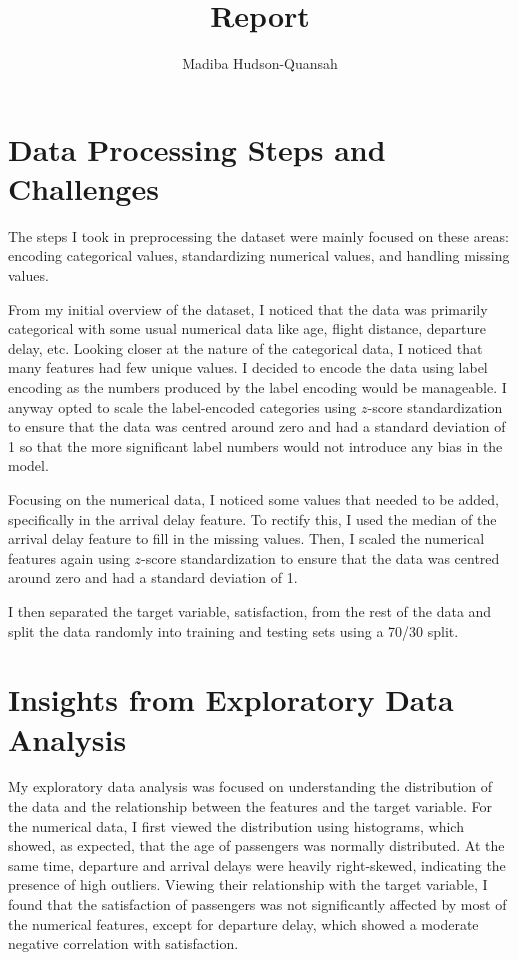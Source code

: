 \documentclass[12pt letter]{report}
\title{\Huge{Report}}
\author{\huge{Madiba Hudson-Quansah}}
\date{}
\begin{document}
\maketitle
\newpage

\section*{Data Processing Steps and Challenges}

The steps I took in preprocessing the dataset were mainly focused on these areas: encoding categorical values,
standardizing numerical values, and handling missing values.

From my initial overview of the dataset, I noticed that the data was primarily categorical with some usual numerical data
like age, flight distance, departure delay, etc. Looking closer at the nature of the categorical data, I noticed that
many features had few unique values. I decided to encode the data using label encoding as the
numbers produced by the label encoding would be manageable. I anyway opted to scale the label-encoded categories
using $z$-score standardization to ensure that the data was centred around zero and had a standard deviation of 1 so
that the more significant label numbers would not introduce any bias in the model.

Focusing on the numerical data, I noticed some values that needed to be added, specifically in the arrival delay feature.
To rectify this, I used the median of the arrival delay feature to fill in the missing values. Then, I scaled the
numerical features again using $z$-score standardization to ensure that the data was centred around zero and had a standard deviation of 1.

I then separated the target variable, satisfaction, from the rest of the data and split the data randomly into training
and testing sets using a 70/30 split.

\section*{Insights from Exploratory Data Analysis}

My exploratory data analysis was focused on understanding the distribution of the data and the relationship between the
features and the target variable. For the numerical data, I first viewed the distribution using histograms, which showed, as expected, that the age of passengers was normally distributed. At the same time, departure and arrival delays
were heavily right-skewed, indicating the presence of high outliers. Viewing their relationship with the target
variable, I found that the satisfaction of passengers was not significantly affected by most of the numerical features,
except for departure delay, which showed a moderate negative correlation with satisfaction.
\end{document}

